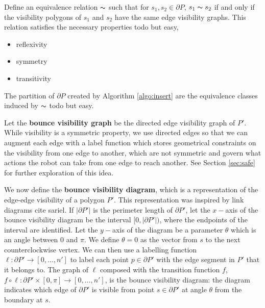 \documentclass[]{svproc}  %
\begin{document}
Define an equivalence relation $\thicksim$ such that for $s_1, s_2 \in \partial
P$, $s_1 \thicksim s_2$ if and only if the visibility polygons of $s_1$ and $s_2$ have
the same edge visibility graphs. This relation satisfies the necessary
properties {\color{red} todo but easy},

\begin{itemize}
\item reflexivity
\item symmetry
\item transitivity
\end{itemize}

The partition of $\partial P$ created by Algorithm \ref{algo:insert} are the
equivalence classes induced by $\thicksim$ {\color{red} todo but easy}.


Let the \textbf{bounce visibility graph} be the directed edge visibility graph of
$P'$. While visibility is a symmetric property, we use directed edges so that 
we can augment each edge with a label function which stores
geometrical constraints on the visibility from one edge to another, which are
not symmetric and govern what actions the robot can take from one edge to
reach another. See Section \ref{sec:safe} for further exploration of this idea.


We now define the \textbf{bounce visibility diagram}, which is a
representation of the edge-edge visibility of a polygon $P'$. This representation
was inspired by link diagrams \cite{tan_sweep}{\color{red} cite sariel}.
If $|\partial P'|$ is the perimeter length of $\partial P'$, let the $x-$axis of the
bounce visibility diagram be the interval $[0, |\partial P'|)$, where the
endpoints of the interval are identified. Let the $y-$axis of the diagram be a
parameter $\theta$ which is an angle between $0$ and $\pi$.
We define $\theta = 0$ as the vector from $s$ to the next counterclockwise vertex.
We can then use a labelling function $\ell: \partial P' \to [0, \ldots, n']$ to
label each point $p \in \partial P'$ with the edge segment in $P'$ that it
belongs to. The graph of $\ell$ composed with the transition function $f$, $f \circ
\ell: \partial P' \times [0, \pi] \to [0, \ldots, n']$, is the bounce visibility diagram: the diagram indicates which edge
of $\partial P'$ is visible from point $s \in \partial P'$ at angle $\theta$ from the
boundary at $s$.
\end{document}
